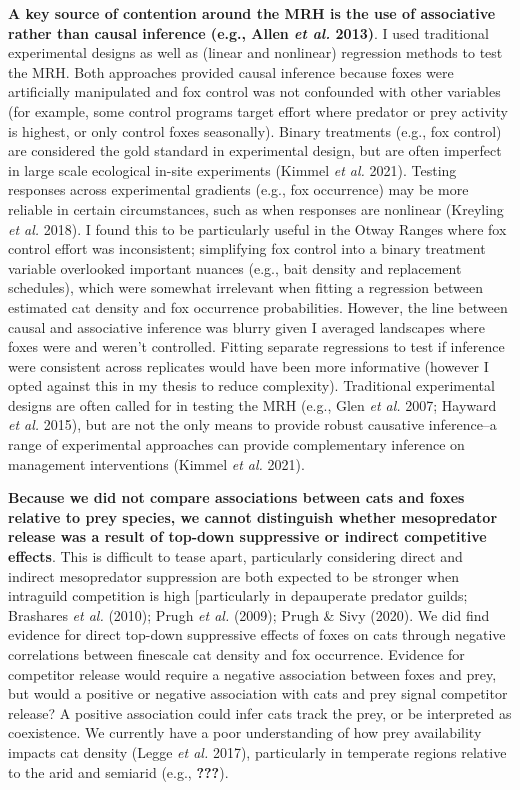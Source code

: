 \documentclass[11pt,a4paper,titlepage,twoside,openright]{style/unimelbthesis}
\begin{document}
\begin{mainmatter}
\textbf{A key source of contention around the MRH is the use of associative rather than causal inference (e.g., Allen \emph{et al.} 2013)}. I used traditional experimental designs as well as (linear and nonlinear) regression methods to test the MRH. Both approaches provided causal inference because foxes were artificially manipulated and fox control was not confounded with other variables (for example, some control programs target effort where predator or prey activity is highest, or only control foxes seasonally). Binary treatments (e.g., fox control) are considered the gold standard in experimental design, but are often imperfect in large scale ecological in-site experiments (Kimmel \emph{et al.} 2021). Testing responses across experimental gradients (e.g., fox occurrence) may be more reliable in certain circumstances, such as when responses are nonlinear (Kreyling \emph{et al.} 2018). I found this to be particularly useful in the Otway Ranges where fox control effort was inconsistent; simplifying fox control into a binary treatment variable overlooked important nuances (e.g., bait density and replacement schedules), which were somewhat irrelevant when fitting a regression between estimated cat density and fox occurrence probabilities. However, the line between causal and associative inference was blurry given I averaged landscapes where foxes were and weren't controlled. Fitting separate regressions to test if inference were consistent across replicates would have been more informative (however I opted against this in my thesis to reduce complexity). Traditional experimental designs are often called for in testing the MRH (e.g., Glen \emph{et al.} 2007; Hayward \emph{et al.} 2015), but are not the only means to provide robust causative inference--a range of experimental approaches can provide complementary inference on management interventions (Kimmel \emph{et al.} 2021).

\textbf{Because we did not compare associations between cats and foxes relative to prey species, we cannot distinguish whether mesopredator release was a result of top-down suppressive or indirect competitive effects}. This is difficult to tease apart, particularly considering direct and indirect mesopredator suppression are both expected to be stronger when intraguild competition is high {[}particularly in depauperate predator guilds; Brashares \emph{et al.} (2010); Prugh \emph{et al.} (2009); Prugh \& Sivy (2020). We did find evidence for direct top-down suppressive effects of foxes on cats through negative correlations between finescale cat density and fox occurrence. Evidence for competitor release would require a negative association between foxes and prey, but would a positive or negative association with cats and prey signal competitor release? A positive association could infer cats track the prey, or be interpreted as coexistence. We currently have a poor understanding of how prey availability impacts cat density (Legge \emph{et al.} 2017), particularly in temperate regions relative to the arid and semiarid (e.g., {\textbf{???}}).


\end{mainmatter}
\end{document}
